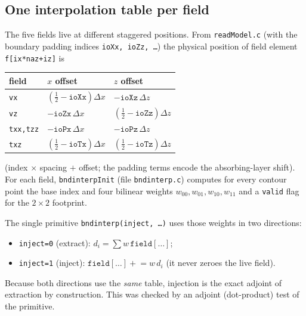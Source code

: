 \documentclass[11pt,a4paper]{article}
\begin{document}
\subsection{One interpolation table per field}
The five fields live at different staggered positions. From \texttt{readModel.c}
(with the boundary padding indices \texttt{ioXx, ioZz, \dots}) the physical
position of field element \texttt{f[ix*naz+iz]} is
\begin{center}
\begin{tabular}{lll}\toprule
field & $x$ offset & $z$ offset\\\midrule
\texttt{vx}  & $(\tfrac12-\texttt{ioXx})\Delta x$ & $-\texttt{ioXz}\,\Delta z$\\
\texttt{vz}  & $-\texttt{ioZx}\,\Delta x$ & $(\tfrac12-\texttt{ioZz})\Delta z$\\
\texttt{txx,tzz} & $-\texttt{ioPx}\,\Delta x$ & $-\texttt{ioPz}\,\Delta z$\\
\texttt{txz} & $(\tfrac12-\texttt{ioTx})\Delta x$ & $(\tfrac12-\texttt{ioTz})\Delta z$\\\bottomrule
\end{tabular}
\end{center}
(index $\times$ spacing $+$ offset; the padding terms encode the absorbing-layer
shift). For each field, \texttt{bndinterpInit} (file \texttt{bndinterp.c}) computes
for every contour point the base index and four bilinear weights
$w_{00},w_{01},w_{10},w_{11}$ and a \texttt{valid} flag for the $2\times2$ footprint.

The single primitive \texttt{bndinterp(inject, \dots)} uses those weights in two
directions:
\begin{itemize}[leftmargin=1.2em]
\item \texttt{inject=0} (extract): $d_i=\sum w\,\texttt{field}[\dots]$;
\item \texttt{inject=1} (inject): $\texttt{field}[\dots]\mathrel{+}=w\,d_i$
  (it never zeroes the live field).
\end{itemize}
Because both directions use the \emph{same} table, injection is the exact
adjoint of extraction by construction. This was checked by an adjoint (dot-product)
test of the primitive.
\end{document}
